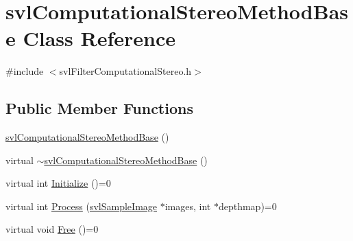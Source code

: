\hypertarget{classsvl_computational_stereo_method_base}{\section{svl\-Computational\-Stereo\-Method\-Base Class Reference}
\label{classsvl_computational_stereo_method_base}
}


{\ttfamily \#include $<$svl\-Filter\-Computational\-Stereo.\-h$>$}

\subsection*{Public Member Functions}
\begin{DoxyCompactItemize}
\item 
\hyperlink{classsvl_computational_stereo_method_base_ad5e9e01929edcf95eda796803e30540a}{svl\-Computational\-Stereo\-Method\-Base} ()
\item 
virtual \hyperlink{classsvl_computational_stereo_method_base_abab381d5badf7c14d8624776136089dd}{$\sim$svl\-Computational\-Stereo\-Method\-Base} ()
\item 
virtual int \hyperlink{classsvl_computational_stereo_method_base_a87f9f845e3f75d4e9793d8ffe08ea661}{Initialize} ()=0
\item 
virtual int \hyperlink{classsvl_computational_stereo_method_base_a4e1e18862a68e97522d2a8d8d54375de}{Process} (\hyperlink{classsvl_sample_image}{svl\-Sample\-Image} $\ast$images, int $\ast$depthmap)=0
\item 
virtual void \hyperlink{classsvl_computational_stereo_method_base_a794421f1857e9f5ece1ee036d6a3fb2f}{Free} ()=0
\end{DoxyCompactItemize}


